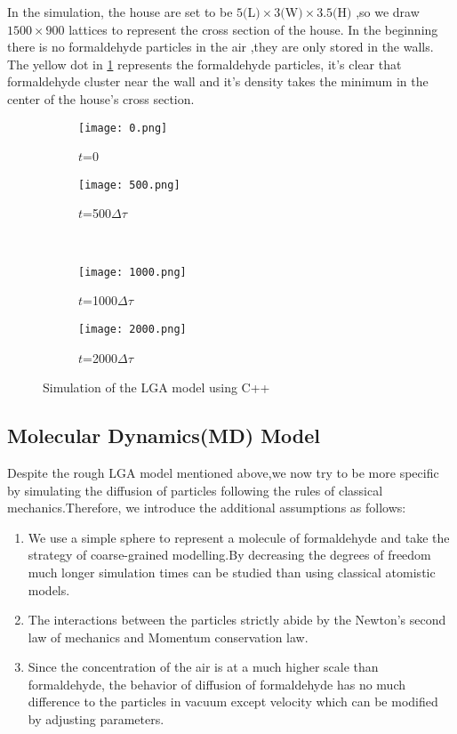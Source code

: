 \documentclass{mcmthesis}
\begin{document}
  In the simulation, the house are set to be $5($L$)\times3($W$)\times3.5($H$)$ ,so we draw $1500\times900$ lattices to represent the cross section of the house. In the beginning there is no formaldehyde particles in the air ,they are only stored in the walls. The yellow dot in \ref{fig:simu} represents the formaldehyde particles, it's clear that formaldehyde cluster near the wall and it's density takes the minimum in the center of the house's cross section.
  
\begin{figure}[H]
  \centering
  \begin{subfigure}[b]{0.48\linewidth}
    \texttt{[image: 0.png]}
    \caption{$t$=0}
  \end{subfigure}
  \begin{subfigure}[b]{0.48\linewidth}
    \texttt{[image: 500.png]}
    \caption{$t$=500$\Delta \tau$}
  \end{subfigure}\\
  \begin{subfigure}[b]{0.48\linewidth}
    \texttt{[image: 1000.png]}
    \caption{$t$=1000$\Delta \tau$}
  \end{subfigure}
  \begin{subfigure}[b]{0.48\linewidth}
    \texttt{[image: 2000.png]}
    \caption{$t$=2000$\Delta \tau$}
  \end{subfigure}
  \caption{Simulation of the LGA model using C++}
  \label{fig:simu}
\end{figure}
  
\subsection{Molecular Dynamics(MD) Model}
Despite the rough LGA model mentioned above,we now try to be more specific by simulating the diffusion of particles following the rules of classical mechanics.Therefore, we introduce the additional assumptions as follows:
\begin{enumerate}

\item We use a simple sphere to represent a molecule of formaldehyde and take the strategy of coarse-grained modelling.By decreasing the degrees of freedom much longer simulation times can be studied than using classical atomistic models. 

\item The interactions between the particles strictly abide by the Newton's second law of mechanics and Momentum conservation law.

\item Since the concentration of the air is at a much higher scale than formaldehyde, the behavior of diffusion of formaldehyde has no much difference to the particles in vacuum except velocity which can be modified by adjusting parameters.

\end{enumerate}
\end{document}
